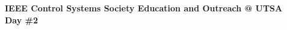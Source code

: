 \documentclass[11pt]{article}
\begin{document}
\begin{center}
{ \Large \bfseries IEEE Control Systems Society Education and Outreach @ UTSA}\\[0.4cm]
{ \large \bfseries Day \#2}\\[0.2cm]
\end{center}


\end{document}
